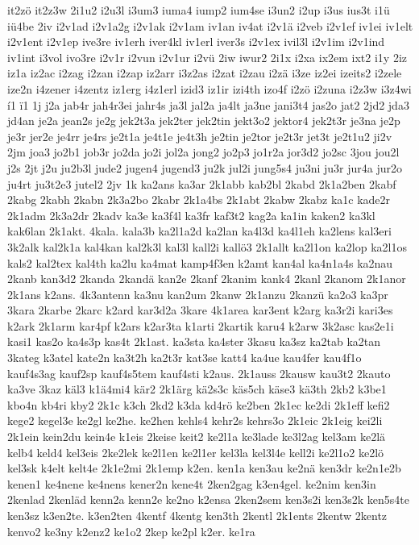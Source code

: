 {it2zö
it2z3w
2i1u2
i2u3l
i3um3
iuma4
iump2
ium4se
i3un2
i2up
i3us
ius3t
i1ü
iü4be
2iv
i2v1ad
i2v1a2g
i2v1ak
i2v1am
iv1an
iv4at
i2v1ä
i2veb
i2v1ef
iv1ei
iv1elt
i2v1ent
i2v1ep
ive3re
iv1erh
iver4kl
iv1erl
iver3s
i2v1ex
ivil3l
i2v1im
i2v1ind
iv1int
i3vol
ivo3re
i2v1r
i2vun
i2v1ur
i2vü
2iw
iwur2
2i1x
i2xa
ix2em
ixt2
i1y
2iz
iz1a
iz2ac
i2zag
i2zan
i2zap
iz2arr
i3z2as
i2zat
i2zau
i2zä
i3ze
iz2ei
izeits2
i2zele
ize2n
i4zener
i4zentz
iz1erg
i4z1erl
izid3
iz1ir
izi4th
izo4f
i2zö
i2zuna
i2z3w
i3z4wi
í1
ï1
1j
j2a
jab4r
jah4r3ei
jahr4s
ja3l
jal2a
ja4lt
ja3ne
jani3t4
jas2o
jat2
2jd2
jda3
jd4an
je2a
jean2s
je2g
jek2t3a
jek2ter
jek2tin
jekt3o2
jektor4
jek2t3r
je3na
je2p
je3r
jer2e
je4rr
je4rs
je2t1a
je4t1e
je4t3h
je2tin
je2tor
je2t3r
jet3t
je2t1u2
ji2v
2jm
joa3
jo2b1
job3r
jo2da
jo2i
jol2a
jong2
jo2p3
jo1r2a
jor3d2
jo2sc
3jou
jou2l
j2s
2jt
j2u
ju2b3l
jude2
jugen4
jugend3
ju2k
jul2i
jung5s4
ju3ni
ju3r
jur4a
jur2o
ju4rt
ju3t2e3
jutel2
2jv
1k
ka2ans
ka3ar
2k1abb
kab2bl
2kabd
2k1a2ben
2kabf
2kabg
2kabh
2kabn
2k3a2bo
2kabr
2k1a4bs
2k1abt
2kabw
2kabz
ka1c
kade2r
2k1adm
2k3a2dr
2kadv
ka3e
ka3f4l
ka3fr
kaf3t2
kag2a
ka1in
kaken2
ka3kl
kak6lan
2k1akt.
4kala.
kala3b
ka2l1a2d
ka2lan
ka4l3d
ka4l1eh
ka2lens
kal3eri
3k2alk
kal2k1a
kal4kan
kal2k3l
kal3l
kall2i
kallö3
2k1allt
ka2l1on
ka2lop
ka2l1os
kals2
kal2tex
kal4th
ka2lu
ka4mat
kamp4f3en
k2amt
kan4al
ka4n1a4s
ka2nau
2kanb
kan3d2
2kanda
2kandä
kan2e
2kanf
2kanim
kank4
2kanl
2kanom
2k1anor
2k1ans
k2ans.
4k3antenn
ka3nu
kan2um
2kanw
2k1anzu
2kanzü
ka2o3
ka3pr
3kara
2karbe
2karc
k2ard
kar3d2a
3kare
4k1area
kar3ent
k2arg
ka3r2i
kari3es
k2ark
2k1arm
kar4pf
k2ars
k2ar3ta
k1arti
2kartik
karu4
k2arw
3k2asc
kas2e1i
kasi1
kas2o
ka4s3p
kas4t
2k1ast.
ka3sta
ka4ster
3kasu
ka3sz
ka2tab
ka2tan
3kateg
k3atel
kate2n
ka3t2h
ka2t3r
kat3se
katt4
ka4ue
kau4fer
kau4f1o
kauf4s3ag
kauf2sp
kauf4s5tem
kauf4sti
k2aus.
2k1auss
2kausw
kau3t2
2kauto
ka3ve
3kaz
käl3
k1ä4mi4
kär2
2k1ärg
kä2s3c
käs5ch
käse3
kä3th
2kb2
k3be1
kbo4n
kb4ri
kby2
2k1c
k3ch
2kd2
k3da
kd4rö
ke2ben
2k1ec
ke2di
2k1eff
kefi2
kege2
kegel3e
ke2gl
ke2he.
ke2hen
kehls4
kehr2s
kehrs3o
2k1eic
2k1eig
kei2li
2k1ein
kein2du
kein4e
k1eis
2keise
keit2
ke2l1a
ke3lade
ke3l2ag
kel3am
ke2lä
kelb4
keld4
kel3eis
2ke2lek
ke2l1en
ke2l1er
kel3la
kel3l4e
kell2i
ke2l1o2
ke2lö
kel3sk
k4elt
kelt4e
2k1e2mi
2k1emp
k2en.
ken1a
ken3au
ke2nä
ken3dr
ke2n1e2b
kenen1
ke4nene
ke4nens
kener2n
kene4t
2ken2gag
k3en4gel.
ke2nim
ken3in
2kenlad
2kenläd
kenn2a
kenn2e
ke2no
k2ensa
2ken2sem
ken3s2i
ken3s2k
ken5s4te
ken3sz
k3en2te.
k3en2ten
4kentf
4kentg
ken3th
2kentl
2k1ents
2kentw
2kentz
kenvo2
ke3ny
k2enz2
ke1o2
2kep
ke2pl
k2er.
ke1ra
}
